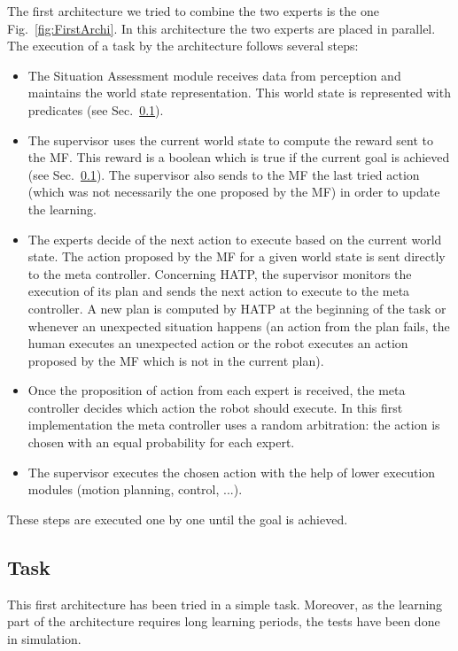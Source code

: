 \documentclass[english,a4paper,11pt,twoside]{StyleThese}
\begin{document}
The first architecture we tried to combine the two experts is the one Fig.~\ref{fig:FirstArchi}. In this architecture the two experts are placed in parallel. The execution of a task by the architecture follows several steps:
\begin{itemize}
\item The Situation Assessment module receives data from perception and maintains the world state representation. This world state is represented with predicates (see Sec.~\ref{subsec:taskOne}).
\item The supervisor uses the current world state to compute the reward sent to the MF. This reward is a boolean which is true if the current goal is achieved (see Sec.~\ref{subsec:taskOne}). The supervisor also sends to the MF the last tried action (which was not necessarily the one proposed by the MF) in order to update the learning.
\item The experts decide of the next action to execute based on the current world state. The action proposed by the MF for a given world state is sent directly to the meta controller. Concerning HATP, the supervisor monitors the execution of its plan and sends the next action to execute to the meta controller. A new plan is computed by HATP at the beginning of the task or whenever an unexpected situation happens (an action from the plan fails, the human executes an unexpected action or the robot executes an action proposed by the MF which is not in the current plan).
\item Once the proposition of action from each expert is received, the meta controller decides which action the robot should execute. In this first implementation the meta controller uses a random arbitration: the action is chosen with an equal probability for each expert.
\item The supervisor executes the chosen action with the help of lower execution modules (motion planning, control, ...). 
\end{itemize}
These steps are executed one by one until the goal is achieved.



\subsection{Task}

\label{subsec:taskOne}

This first architecture has been tried in a simple task. Moreover, as the learning part of the architecture requires long learning periods, the tests have been done in simulation.
\end{document}
